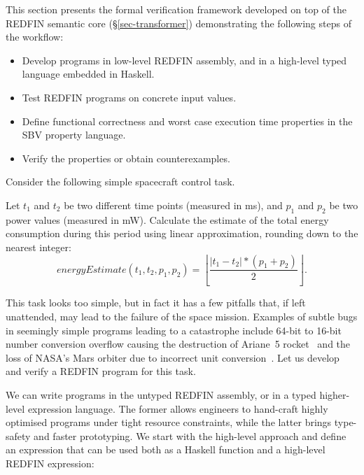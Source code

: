 This section presents the formal verification framework developed on top of
the REDFIN semantic core (\S\ref{sec-transformer}) demonstrating the following
steps of the workflow:



\vspace{-0.5mm}
\begin{itemize}
    \item Develop programs in low-level REDFIN assembly, and in a high-level
    typed language embedded in Haskell.
    \item Test REDFIN programs on concrete input values.
    \item Define functional correctness and worst case execution time properties
    in the SBV property language.
    \item Verify the properties or obtain counterexamples.
\end{itemize}
\vspace{-0.5mm}

\noindent
Consider the following simple spacecraft control task.

\vspace{-0.25mm}
\begin{tcolorbox}
\vspace{-1.5mm}
Let $t_1$ and $t_2$ be two different time points (measured in ms),
and $p_1$ and $p_2$ be two power values (measured in mW).
Calculate the estimate of the total energy consumption during this period
using linear approximation, rounding down to the nearest integer:
\vspace{1mm}
\[
\textit{energyEstimate}(t_1, t_2, p_1, p_2) = \left\lfloor \frac{|t_1 - t_2| * (p_1 + p_2)}{2} \right\rfloor.
\]
\vspace{-2.5mm}
\end{tcolorbox}
\vspace{-0.25mm}

\noindent
This task looks too simple, but in fact it has a few pitfalls that,
if left unattended, may lead to the failure of the space mission. Examples
of subtle bugs in seemingly simple programs leading to a catastrophe include 64-bit
to 16-bit number conversion overflow causing the destruction of Ariane~5
rocket~\cite{bug-rocket} and the loss of NASA's Mars orbiter due to incorrect
unit conversion~\cite{NASA:1999:Mars}. Let us develop and verify
a REDFIN program for this task.

We can write programs in the untyped REDFIN assembly, or in a typed higher-level
expression language. The former allows engineers to hand-craft highly optimised
programs under tight resource constraints, while the latter brings type-safety
and faster prototyping. We start with the high-level approach and define an
expression that can be used both as a Haskell function and a high-level REDFIN
expression:

